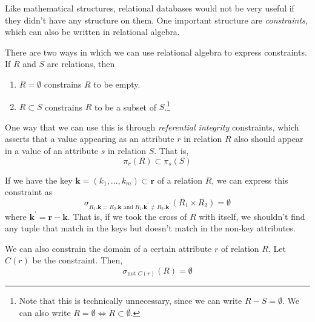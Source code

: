\documentclass{article}
\begin{document}
    Like mathematical structures, relational databases would not be very useful if they didn't have any structure on them. One important structure are \textit{constraints}, which can also be written in relational algebra. 

    \begin{definition}
      There are two ways in which we can use relational algebra to express constraints. If $R$ and $S$ are relations, then 
      \begin{enumerate}
        \item $R = \emptyset$ constrains $R$ to be empty.
        \item $R \subset S$ constrains $R$ to be a subset of $S$.\footnote{Note that this is technically unnecessary, since we can write $R - S = \emptyset$. We can also write $R = \emptyset \iff R \subset \emptyset$.}
      \end{enumerate}
    \end{definition} 

    \begin{definition}
      One way that we can use this is through \textit{referential integrity} constraints, which asserts that a value appearing as an attribute $r$ in relation $R$ also should appear in a value of an attribute $s$ in relation $S$. That is, 
      \begin{equation}
        \pi_r (R) \subset \pi_s (S)
      \end{equation}
    \end{definition}

    \begin{definition}
      If we have the key $\mathbf{k} = (k_1, \ldots, k_m) \subset \mathbf{r}$ of a relation $R$, we can express this constraint as 
      \begin{equation}
        \sigma_{R_1.\mathbf{k} = R_2.\mathbf{k} \text{ and } R_1.\mathbf{k}^\prime \neq R_2.\mathbf{k}^\prime} (R_1 \times R_2) = \emptyset
      \end{equation}
      where $\mathbf{k}^\prime = \mathbf{r} - \mathbf{k}$. That is, if we took the cross of $R$ with itself, we shouldn't find any tuple that match in the keys but doesn't match in the non-key attributes. 
    \end{definition}

    \begin{definition}
      We can also constrain the domain of a certain attribute $r$ of relation $R$. Let $C(r)$ be the constraint. Then, 
      \begin{equation}
        \sigma_{\text{not } C(r)} (R) = \emptyset
      \end{equation}
    \end{definition}
\end{document}
